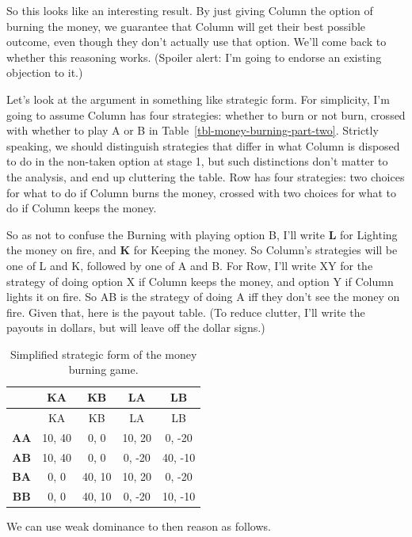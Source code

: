 \documentclass[
  12pt,
  letterpaper,
  DIV=11,
  numbers=noendperiod]{scrreprt}
\begin{document}
So this looks like an interesting result. By just giving Column the
option of burning the money, we guarantee that Column will get their
best possible outcome, even though they don't actually use that option.
We'll come back to whether this reasoning works. (Spoiler alert: I'm
going to endorse an existing objection to it.)

Let's look at the argument in something like strategic form. For
simplicity, I'm going to assume Column has four strategies: whether to
burn or not burn, crossed with whether to play A or B in
Table~\ref{tbl-money-burning-part-two}. Strictly speaking, we should
distinguish strategies that differ in what Column is disposed to do in
the non-taken option at stage 1, but such distinctions don't matter to
the analysis, and end up cluttering the table. Row has four strategies:
two choices for what to do if Column burns the money, crossed with two
choices for what to do if Column keeps the money.

So as not to confuse the Burning with playing option B, I'll write
\textbf{L} for Lighting the money on fire, and \textbf{K} for Keeping
the money. So Column's strategies will be one of L and K, followed by
one of A and B. For Row, I'll write XY for the strategy of doing option
X if Column keeps the money, and option Y if Column lights it on fire.
So AB is the strategy of doing A iff they don't see the money on fire.
Given that, here is the payout table. (To reduce clutter, I'll write the
payouts in dollars, but will leave off the dollar signs.)

\begin{longtable}[]{@{}ccccc@{}}
\caption{Simplified strategic form of the money burning
game.}\label{tbl-money-burning}\tabularnewline
\toprule\noalign{}
& KA & KB & LA & LB \\
\midrule\noalign{}
\endfirsthead
\toprule\noalign{}
& KA & KB & LA & LB \\
\midrule\noalign{}
\endhead
\bottomrule\noalign{}
\endlastfoot
\textbf{AA} & 10, 40 & 0, 0 & 10, 20 & 0, -20 \\
\textbf{AB} & 10, 40 & 0, 0 & 0, -20 & 40, -10 \\
\textbf{BA} & 0, 0 & 40, 10 & 10, 20 & 0, -20 \\
\textbf{BB} & 0, 0 & 40, 10 & 0, -20 & 10, -10 \\
\end{longtable}

We can use weak dominance to then reason as follows.
\end{document}
